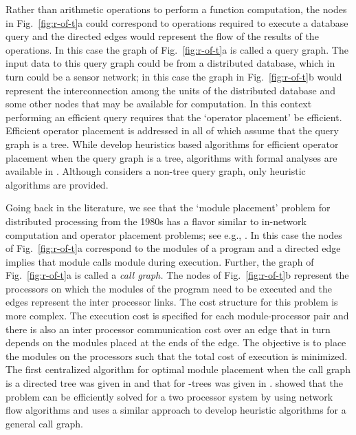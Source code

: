 \documentclass[journal]{IEEEtran}
\begin{document}
Rather than arithmetic operations to perform a function computation,
the nodes in Fig.~\ref{fig:r-of-t}a could correspond to operations
required to execute a database query and the directed edges would
represent the flow of the results of the operations. In this case the
graph of Fig.~\ref{fig:r-of-t}a is called a query graph. The input
data to this query graph could be from a distributed database, which
in turn could be a sensor network; in this case the graph in
Fig.~\ref{fig:r-of-t}b would represent the interconnection among the
units of the distributed database and some other nodes that may be
available for computation. In this context performing an efficient
query requires that the `operator placement' be efficient. Efficient
operator placement is addressed in
\cite{Bonfils04,Srivastsava05,Abrams05,Pietzuch06,Ying08,Wen13} all of
which assume that the query graph is a tree. While
\cite{Wen13,Pietzuch06,Bonfils04} develop heuristics based algorithms
for efficient operator placement when the query graph is a tree,
algorithms with formal analyses are available in
\cite{Srivastsava05,Abrams05,Ying08}. Although \cite{Phatak10}
considers a non-tree query graph, only heuristic algorithms are
provided.

Going back in the literature, we see that the `module placement'
problem for distributed processing from the 1980s has a flavor similar
to in-network computation and operator placement problems; see e.g.,
\cite{Stone77,Bokhari81,MaryLo88,Bokhari88,Fernandez-Baca89}. In this
case the nodes of Fig.~\ref{fig:r-of-t}a correspond to the modules of
a program and a directed edge  implies that module  calls
module  during execution.  Further, the graph of
Fig.~\ref{fig:r-of-t}a is called a \textit{call graph.} The nodes of
Fig.~\ref{fig:r-of-t}b represent the processors on which the modules
of the program need to be executed and the edges represent the inter
processor links. The cost structure for this problem is more
complex. The execution cost is specified for each module-processor
pair and there is also an inter processor communication cost over an
edge that in turn depends on the modules placed at the ends of the
edge. The objective is to place the modules on the processors such
that the total cost of execution is minimized.  The first centralized
algorithm for optimal module placement when the call graph is a
directed tree was given in \cite{Bokhari81} and that for -trees was
given in \cite{Fernandez-Baca89}. \cite{Stone77} showed that the
problem can be efficiently solved for a two processor system by using
network flow algorithms and \cite{MaryLo88} uses a similar approach to
develop heuristic algorithms for a general call graph.
\end{document}
